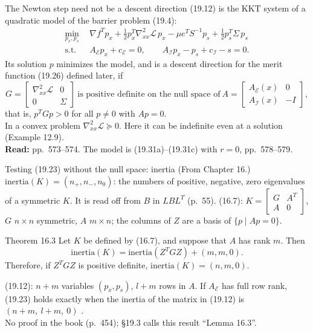 \documentclass[aspectratio=169,12pt]{beamer}
\newcommand{\gradf}{\nabla f}
\newcommand{\eqn}[1]{\text{\small(#1)}}
\newcommand{\readbook}[1]{{\color{red}\textbf{Read:} #1}}
\newcommand{\cE}{\mathcal{E}}
\newcommand{\cI}{\mathcal{I}}
\newcommand{\cL}{\mathcal{L}}
\newcommand{\hessL}{\nabla_{xx}^{2}\cL}
\newcommand{\Ae}{A_{\cE}}
\newcommand{\Ai}{A_{\cI}}
\newcommand{\from}[1]{{\small(From #1.)}}
\begin{document}
\begin{frame}{The Newton step need not be a descent direction}
  (19.12) is the KKT system of a quadratic model of the barrier problem (19.4):
  \begin{align*}
    \min_{p_{x},p_{s}}\ \ & \gradf^{T}p_{x}+\tfrac12 p_{x}^{T}\hessL\,p_{x}-\mu e^{T}S^{-1}p_{s}+\tfrac12 p_{s}^{T}\Sigma\,p_{s}\\
    \text{s.t.}\ \ & \Ae p_{x}+c_{\cE}=0,\qquad \Ai p_{x}-p_{s}+c_{\cI}-s=0 .
  \end{align*}
  Its solution $p$ minimizes the model, and is a descent direction for the merit function (19.26) defined later, if
  \[ G=\begin{bmatrix}\hessL & 0\\ 0 & \Sigma\end{bmatrix}\ \text{is positive definite on the null space of}\
     A=\begin{bmatrix}\Ae(x) & 0\\ \Ai(x) & -I\end{bmatrix}, \tag{19.23} \]
  that is, $p^{T}Gp>0$ for all $p\ne 0$ with $Ap=0$.\\[0.2em]
  In a convex problem $\hessL\succeq 0$. Here it can be indefinite even at a solution (Example 12.9).\\
  \readbook{pp.~573--574. The model is (19.31a)--(19.31c) with $r=0$, pp.~578--579.}
\end{frame}

\begin{frame}{Testing (19.23) without the null space: inertia \from{Chapter 16}}
  $\mathrm{inertia}(K)=(n_{+},n_{-},n_{0})$: the numbers of positive, negative, zero eigenvalues of a symmetric $K$.
  It is read off from $B$ in $LBL^{T}$ (p.~55).
  (16.7): $K=\begin{bmatrix} G & A^{T}\\ A & 0\end{bmatrix}$, $G$ $n\times n$ symmetric, $A$ $m\times n$;
  the columns of $Z$ are a basis of $\{p\mid Ap=0\}$.
  \begin{block}{Theorem 16.3}
    Let $K$ be defined by (16.7), and suppose that $A$ has rank $m$. Then
    \[ \mathrm{inertia}(K)=\mathrm{inertia}(Z^{T}GZ)+(m,m,0). \]
    Therefore, if $Z^{T}GZ$ is positive definite, $\mathrm{inertia}(K)=(n,m,0)$.
  \end{block}
  (19.12): $n+m$ variables $(p_{x},p_{s})$, $l+m$ rows in $A$. If $\Ae$ has full row rank, (19.23) holds exactly
  when the inertia of the matrix in (19.12) is $(n+m,\ l+m,\ 0)$ \eqn{19.24}.\\
  No proof in the book (p.~454); \S19.3 calls this result ``Lemma 16.3''.
\end{frame}
\end{document}
